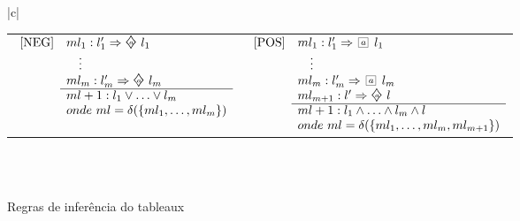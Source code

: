 \begin{figure*}[!tbh]
    \centering
    {\footnotesize
        \begin{tabular}{|c|}
            \hline
            \\
            \begin{tabular}{cc}
                $
                \begin{array}{cll}
                    \mbox{[NEG]} &ml_1: l_1 ' \then \pos{a}~ l_1 \\ 
                                  &\ ~\ \vdots \\
                                  &ml_m: l_m ' \then \pos{a}~ l_m\\ \cline{2-2}
                                  & ml+1: l_1 \vee \ldots \vee l_m \\
                                  & onde\ ml = \delta(\{ml_1,\ldots, ml_m\})
                \end{array}
                $
                &
                $
                \begin{array}{cll}
                    \mbox{[POS]} &ml_1: l_1 ' \then \nec{a}~ l_1 \\ 
                                  &\ ~\ \vdots \\
                                  &ml_m: l_m ' \then \nec{a}~ l_m\\ 
                                  &ml_{m+1}: l' \then \pos{a}~ l \\ \cline{2-2}
                                  & ml+1: l_1 \wedge \ldots \wedge l_m \wedge l \\
                                  & onde\ ml = \delta(\{ml_1,\ldots, ml_m,
                ml_{m+1}\})
                \end{array}
                $
            \end{tabular}
            \\
            \\
            \hline
    \end{tabular}}
            \caption{Regras de inferência do tableaux}
            \label{tableaux}
        \end{figure*}

